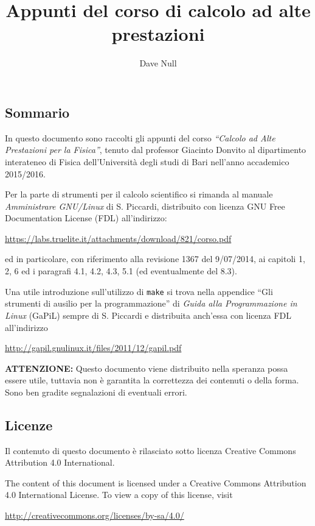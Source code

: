 \documentclass[italian,]{article}
\title{Appunti del corso di calcolo ad alte prestazioni}
\author{Dave Null}
\date{}
\begin{document}
\maketitle

{
\setcounter{tocdepth}{3}
\tableofcontents
}
\newpage

\subsection{Sommario}\label{sommario}

In questo documento sono raccolti gli appunti del corso \emph{``Calcolo
ad Alte Prestazioni per la Fisica''}, tenuto dal professor Giacinto
Donvito al dipartimento interateneo di Fisica dell'Università degli
studi di Bari nell'anno accademico 2015/2016.

Per la parte di strumenti per il calcolo scientifico si rimanda al
manuale \emph{Amministrare GNU/Linux} di S. Piccardi, distribuito con
licenza GNU Free Documentation License (FDL) all'indirizzo:

\url{https://labs.truelite.it/attachments/download/821/corso.pdf}

ed in particolare, con riferimento alla revisione 1367 del 9/07/2014, ai
capitoli 1, 2, 6 ed i paragrafi 4.1, 4.2, 4.3, 5.1 (ed eventualmente del
8.3).

Una utile introduzione sull'utilizzo di \texttt{make} si trova nella
appendice ``Gli strumenti di ausilio per la programmazione'' di
\emph{Guida alla Programmazione in Linux} (GaPiL) sempre di S. Piccardi
e distribuita anch'essa con licenza FDL all'indirizzo

\url{http://gapil.gnulinux.it/files/2011/12/gapil.pdf}

\textbf{ATTENZIONE:} Questo documento viene distribuito nella speranza
possa essere utile, tuttavia non è garantita la correttezza dei
contenuti o della forma. Sono ben gradite segnalazioni di eventuali
errori.

\subsection{Licenze}\label{licenze}

Il contenuto di questo documento è rilasciato sotto licenza Creative
Commons Attribution 4.0 International.

The content of this document is licensed under a Creative Commons
Attribution 4.0 International License. To view a copy of this license,
visit

\href{http://creativecommons.org/licenses/by/4.0/}{http://creativecommons.org/licenses/by-sa/4.0/}
\end{document}
